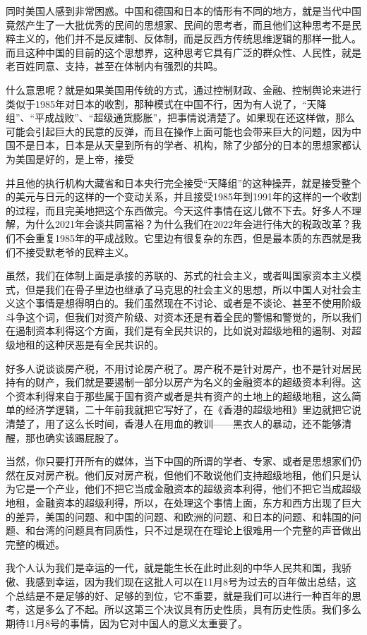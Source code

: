 \documentclass[UTF8, 12pt, a4paper]{ctexrep}
\begin{document}
同时美国人感到非常困惑。中国和德国和日本的情形有不同的地方，就是当代中国竟然产生了一大批优秀的民间的思想家、民间的思考者，而且他们这种思考不是民粹主义的，他们并不是反建制、反体制，而是反西方传统思维逻辑的那样一批人。而且这种中国的目前的这个思想界，这种思考它具有广泛的群众性、人民性，就是老百姓同意、支持，甚至在体制内有强烈的共鸣。

什么意思呢？就是如果美国用传统的方式，通过控制财政、金融、控制舆论来进行类似于1985年对日本的收割，那种模式在中国不行，因为有人说了，“天降组”、“平成战败”、“超级通货膨胀”，把事情说清楚了。如果现在还这样做，那么可能会引起巨大的民意的反弹，而且在操作上面可能也会带来巨大的问题，因为中国不是日本，日本是从天皇到所有的学者、机构，除了少部分的日本的思想家都认为美国是好的，是上帝，接受

并且他的执行机构大藏省和日本央行完全接受“天降组”的这种操弄，就是接受整个的美元与日元的这样的一个变动关系，并且接受1985年到1991年的这样的一个收割的过程，而且完美地把这个东西做完。今天这件事情在这儿做不下去。好多人不理解，为什么2021年会谈共同富裕？为什么我们在2022年会进行伟大的税政改革？我们不会重复1985年的平成战败。它里边有很复杂的东西，但是最本质的东西就是我们不接受默老爷的民粹主义。

虽然，我们在体制上面是承接的苏联的、苏式的社会主义，或者叫国家资本主义模式，但是我们在骨子里边也继承了马克思的社会主义的思想，所以中国人对社会主义这个事情是想得明白的。我们虽然现在不讨论、或者是不谈论、甚至不使用阶级斗争这个词，但我们对资产阶级、对资本还是有着全民的警惕和警觉的，所以我们在遏制资本利得这个方面，我们是有全民共识的，比如说对超级地租的遏制、对超级地租的这种厌恶是有全民共识的。

好多人说谈谈房产税，不用讨论房产税了。房产税不是针对房产，也不是针对居民持有的财产，我们就是要遏制一部分以房产为名义的金融资本的超级资本利得。这个资本利得来自于那些属于国有资产或者是共有资产的土地上的超级地租，这么简单的经济学逻辑，二十年前我就把它写好了，在《香港的超级地租》里边就把它说清楚了，用了这么长时间，香港人在用血的教训——黑衣人的暴动，还不能够清醒，那也确实该踢屁股了。

当然，你只要打开所有的媒体，当下中国的所谓的学者、专家、或者是思想家们仍然在反对房产税。他们反对房产税，但他们不敢说他们支持超级地租，他们只是认为它是一个产业，他们不把它当成金融资本的超级资本利得，他们不把它当成超级地租，金融资本的超级利得，所以，在处理这个事情上面，东方和西方出现了巨大的差异，美国的问题、和中国的问题、和欧洲的问题、和日本的问题、和韩国的问题、和台湾的问题具有同质性，只不过是现在在理论上很难用一个完整的声音做出完整的概述。

我个人认为我们是幸运的一代，就是能生长在此时此刻的中华人民共和国，我骄傲、我感到幸运，因为我们现在这批人可以在11月8号为过去的百年做出总结，这个总结是不是足够的好、足够的到位，它不重要，就是我们可以进行一种百年的思考，这是多么了不起。所以这第三个决议具有历史性质，具有历史性质。我们多么期待11月8号的事情，因为它对中国人的意义太重要了。
\end{document}
